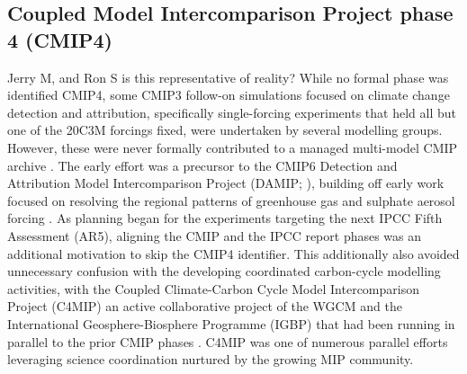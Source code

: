 \documentclass[gmd, preprint]{copernicus}
\newcommand{\mycomment}[1]{}
\def\cred#1{{\color{red}#1}}
\begin{document}
\subsection{Coupled Model Intercomparison Project phase 4 (CMIP4)}
\cred{Jerry M, and Ron S is this representative of reality?}
While no formal phase was identified CMIP4, some CMIP3 follow-on simulations focused on climate change detection and attribution, specifically single-forcing experiments that held all but one of the 20C3M forcings fixed, were undertaken by several modelling groups. However, these were never formally contributed to a managed multi-model CMIP archive \citep{stouffer_cmip5_2017}. The early effort was a precursor to the CMIP6 Detection and Attribution Model Intercomparison Project (DAMIP; \citet{gillett_detection_2016}), building off early work focused on resolving the regional patterns of greenhouse gas and sulphate aerosol forcing \cite{taylor_response_1994, santer_towards_1995, hegerl_optimal_2000, gillett_detecting_2002, hegerl_20c3m_2003}. As planning began for the experiments targeting the next IPCC Fifth Assessment (AR5), aligning the CMIP and the IPCC report phases was an additional motivation to skip the CMIP4 identifier. This additionally also avoided unnecessary confusion with the developing coordinated carbon-cycle modelling activities, with the Coupled Climate-Carbon Cycle Model Intercomparison Project (C4MIP) an active collaborative project of the WGCM and the International Geosphere-Biosphere Programme (IGBP) that had been running in parallel to the prior CMIP phases \citep{fung_full-form_2000, cox_modelling_2002, friedlingstein_climatecarbon_2006}. C4MIP was one of numerous parallel efforts leveraging science coordination nurtured by the growing MIP community.
\mycomment{
CMIP4 comment - https://www.wcrp-climate.org/images/modelling/WGCM/WGCM17/WGCM17_report.pdf#Page=8
}
\end{document}
